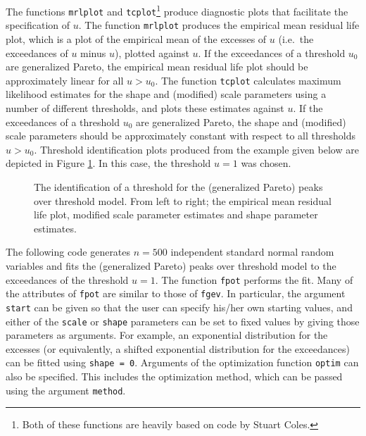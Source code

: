 \documentclass[11pt,a4paper]{article}
\begin{document}
The functions \verb+mrlplot+ and \verb+tcplot+\footnote{Both of these functions are heavily based on code by Stuart Coles.} produce diagnostic plots that facilitate the specification of $u$. The function \verb+mrlplot+ produces the empirical mean residual life plot, which is a plot of the empirical mean of the excesses of $u$ (i.e.\ the exceedances of $u$ minus $u$), plotted against $u$. If the exceedances of a threshold $u_0$ are generalized Pareto, the empirical mean residual life plot should be approximately linear for all $u > u_0$.
The function \verb+tcplot+ calculates maximum likelihood estimates for the shape and (modified) scale parameters using a number of different thresholds, and plots these estimates against $u$.
If the exceedances of a threshold $u_0$ are generalized Pareto, the shape and (modified) scale parameters should be approximately constant with respect to all thresholds $u > u_0$.
Threshold identification plots produced from the example given below are depicted in Figure \ref{threshid}.
In this case, the threshold $u = 1$ was chosen.

\begin{figure}
\begin{center}
\vspace{-1.5cm}
\hspace{0cm}
\hspace{0cm} 
\end{center} 
\caption{The identification of a threshold for the (generalized Pareto) peaks over threshold model. From left to right; the empirical mean residual life plot, modified scale parameter estimates and shape parameter estimates.}
\label{threshid}
\end{figure}

The following code generates $n = 500$ independent standard normal random variables and fits the (generalized Pareto) peaks over threshold model to the exceedances of the threshold $u = 1$. 
The function \verb+fpot+ performs the fit.
Many of the attributes of \verb+fpot+ are similar to those of \verb+fgev+.
In particular, the argument \verb+start+ can be given so that the user can specify his/her own starting values, and either of the \verb+scale+ or \verb+shape+ parameters can be set to fixed values by giving those parameters as arguments.
For example, an exponential distribution for the excesses (or equivalently, a shifted exponential distribution for the exceedances) can be fitted using \verb+shape = 0+.
Arguments of the optimization function \verb+optim+ can also be specified.
This includes the optimization method, which can be passed using the argument \verb+method+.
\end{document}
